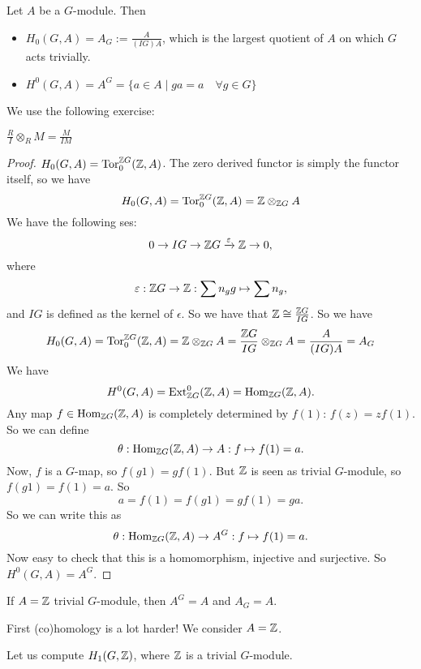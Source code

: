 \begin{prop}[3.7]
    Let $A$ be a $G$-module.
    Then
    \begin{itemize}
        \item $ H_0(G,A) = A_G := \frac{A}{(IG)A}$, which is the largest quotient of $A$ on which  $G$ acts trivially.
        \item $H^{0}(G, A) = A^{G} = \{a \in A  \mid  ga = a \quad \forall  g \in  G\} $
    \end{itemize}
\end{prop}
We use the following exercise:
\begin{ex}
    $\frac{R}{I} \otimes_R M = \frac{M}{IM}$
\end{ex}
\begin{proof}
    $H_0(G,A) = \operatorname{Tor}_0^{\mathbb{Z} G}(\mathbb{Z},A)$.
    The zero derived functor is simply the functor itself, so we have
    \[
    H_0(G,A) = \operatorname{Tor}_0^{\mathbb{Z} G}(\mathbb{Z},A) = \mathbb{Z} \otimes_{\mathbb{Z} G} A
\]
We have the following ses:
\[
0 \to  IG \to  \mathbb{Z} G \xrightarrow{\varepsilon}  \mathbb{Z} \to  0
,\] 
where
\[
    \varepsilon: \mathbb{Z} G \to  \mathbb{Z}: \sum n_g g \mapsto  \sum n_g
,\] 
and $IG$ is defined as the kernel of  $\epsilon$.
So we have that  $\mathbb{Z} \cong \frac{\mathbb{Z} G}{IG}$.
So we have
\[
    H_0(G,A) = \operatorname{Tor}_0^{\mathbb{Z} G}(\mathbb{Z},A) =
    \mathbb{Z} \otimes_{\mathbb{Z} G} A
    = \frac{\mathbb{Z} G}{IG} \otimes_{\mathbb{Z} G} A 
    = \frac{A}{(IG) A} = A_{G}
\]
\hr
We have
\[
    H^{0}(G, A) = \operatorname{Ext}_{\mathbb{Z} G}^{0}(\mathbb{Z}, A) = \operatorname{Hom}_{\mathbb{Z} G}(\mathbb{Z}, A)
.\] 
Any map $f \in \operatorname{Hom}_{\mathbb{Z} G}(\mathbb{Z}, A)$ is completely determined by $f(1)$:  $f(z) = z f(1)$.
So we can define
\[
    \theta: \operatorname{Hom}_{\mathbb{Z} G}(\mathbb{Z}, A) \to  A : f \mapsto f(1) = a
.\] 
Now, $f$ is a  $G$-map, so $f(g 1) = gf(1)$. But  $\mathbb{Z}$ is seen as trivial $G$-module, so $ f(g 1) = f(1) = a$.
So
\[
    a = f(1) = f(g 1) = gf(1) = ga
.\] 
So we can write this as
\[
    \theta: \operatorname{Hom}_{\mathbb{Z} G}(\mathbb{Z}, A) \to  A^{G} : f \mapsto f(1) = a
.\] 
Now easy to check that this is a homomorphism, injective and surjective.
So
$H^{0}(G, A) = A^{G}$.
\end{proof}
\begin{remark}
    If $A = \mathbb{Z}$ trivial $G$-module, then $A^{G} = A$ and $A_G = A$.
\end{remark}

First (co)homology is a lot harder! We consider $A =\mathbb{Z}$.

Let us compute $H_1(G, \mathbb{Z})$, where $\mathbb{Z}$ is a trivial $G$-module.

